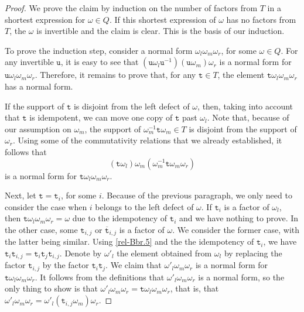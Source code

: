 \documentclass[a4paper]{amsart}
\begin{document}
\begin{proof}
We prove the claim by induction on the number of factors
from $T$ in a shortest expression for $\omega\in Q$.
If this shortest expression of $\omega$ has no factors
from $T$, the $\omega$ is invertible and the claim is clear.
This is the basis of our induction.

To prove the induction step, consider a normal form
$\omega_l\omega_m\omega_r$, for some $\omega\in Q$. 
For any invertible $\mathtt{u}$, it is easy to see that
$(\mathtt{u}\omega_l\mathtt{u}^{-1})(\mathtt{u}\omega_m)\omega_r$ 
is a normal form for $\mathtt{u}\omega_l\omega_m\omega_r$.
Therefore, it remains to prove that, for any $\mathtt{t}\in T$, 
the element $\mathtt{t}\omega_l\omega_m\omega_r$ has a normal form.

If the support of $\mathtt{t}$ is disjoint from the left defect of
$\omega$, then, taking into account that $\mathtt{t}$ is idempotent,
we can move one copy of $\mathtt{t}$ past $\omega_l$. Note that,
because of our assumption on $\omega_m$, the support of 
$\omega_m^{-1}\mathtt{t}\omega_m\in T$ is disjoint from the
support of $\omega_r$. Using some of the commutativity relations 
that we already established, it follows that
\begin{displaymath}
(\mathtt{t}\omega_l)\omega_m(\omega_m^{-1}\mathtt{t}\omega_m\omega_r) 
\end{displaymath}
is a normal form for $\mathtt{t}\omega_l\omega_m\omega_r$.

Next, let $\mathtt{t}=\mathtt{t}_i$, for some $i$. Because of the
previous paragraph, we only need to consider the case when $i$
belongs to the left defect of $\omega$. If $\mathtt{t}_i$ is
a factor of $\omega_l$, then $\mathtt{t}\omega_l\omega_m\omega_r=\omega$
due to the idempotency of $\mathtt{t}_i$ and we have nothing to prove.
In the other case, some $\mathtt{t}_{i,j}$ or 
$\overline{\mathtt{t}}_{i,j}$ is a factor of $\omega$.
We consider the former case, with the latter being similar.
Using \eqref{rel-Bbr.5} and the the idempotency of $\mathtt{t}_i$, 
we have $\mathtt{t}_i\mathtt{t}_{i,j}=\mathtt{t}_i\mathtt{t}_j\mathtt{t}_{i,j}$.
Denote by $\omega'_l$ the element obtained from $\omega_l$ by replacing
the factor $\mathtt{t}_{i,j}$ by the factor $\mathtt{t}_i\mathtt{t}_j$.
We claim that $\omega'_l\omega_m\omega_r$ is a normal form for
$\mathtt{t}\omega_l\omega_m\omega_r$. It follows from the definitions that 
$\omega'_l\omega_m\omega_r$ is a normal form, so the only thing to show
is that $\omega'_l\omega_m\omega_r=\mathtt{t}\omega_l\omega_m\omega_r$,
that is, that $\omega'_l\omega_m\omega_r=
\omega'_l(\mathtt{t}_{i,j}\omega_m)\omega_r$.


\end{proof}
\end{document}
